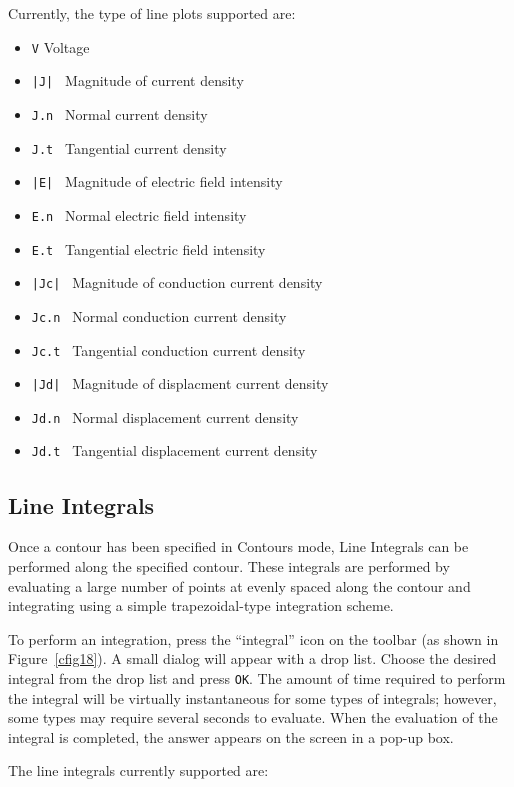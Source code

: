 Currently, the type of line plots supported are: 
\begin{itemize}
    \item {\tt V}      Voltage
	\item {\tt |J|   } Magnitude of current density
	\item {\tt J.n } Normal current density
	\item {\tt J.t } Tangential current density
	\item {\tt |E|   } Magnitude of electric field intensity
	\item {\tt E.n } Normal electric field intensity
	\item {\tt E.t } Tangential electric field intensity
	\item {\tt |Jc|   } Magnitude of conduction current density
	\item {\tt Jc.n } Normal conduction current density
	\item {\tt Jc.t } Tangential conduction current density
	\item {\tt |Jd|   } Magnitude of displacment current density
	\item {\tt Jd.n } Normal displacement current density
	\item {\tt Jd.t } Tangential displacement current density
\end{itemize}
\subsection{Line Integrals}

Once a contour has been specified in Contours mode, Line Integrals can be
performed along the specified contour. These integrals are performed by
evaluating a large number of points at evenly spaced along the contour and
integrating using a simple trapezoidal-type integration scheme.

To perform an integration, press the ``integral'' icon on the
toolbar (as shown in Figure~\ref{cfig18}). A small dialog will appear with a
drop list. Choose the desired integral from the drop list and press
\texttt{OK}. The amount of time required to perform the integral
will be virtually instantaneous for some types of integrals;
however, some types may require several seconds to evaluate. When
the evaluation of the integral is completed, the answer appears on
the screen in a pop-up box.

The line integrals currently supported are:

